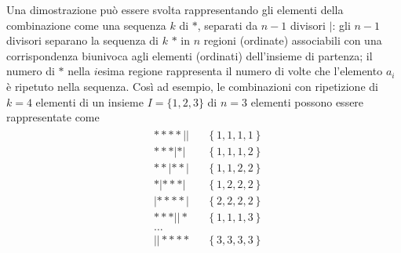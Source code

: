 \documentclass[letterpaper,10pt,italian]{jupyterBook}
\begin{document}
\sphinxAtStartPar
Una dimostrazione può essere svolta rappresentando gli elementi della combinazione come una sequenza \(k\) di \(\ast\), separati da \(n-1\) divisori \(|\): gli \(n-1\) divisori separano la sequenza di \(k\) \(\ast\) in \(n\) regioni (ordinate) associabili con una corrispondenza biunivoca agli elementi (ordinati) dell’insieme di partenza; il numero di \(\ast\) nella \(i\)\sphinxhyphen{}esima regione rappresenta il numero di volte che l’elemento \(a_i\) è ripetuto nella sequenza. Così ad esempio, le combinazioni con ripetizione di \(k=4\) elementi di un insieme \(I = \{ 1,2,3 \}\) di \(n=3\) elementi possono essere rappresentate come
\begin{equation*}
\begin{split}\begin{aligned}
  &    \ast    \ast   \ast    \ast || && \left\{  1,1,1,1 \right\} \\
  &    \ast    \ast   \ast |  \ast |  && \left\{  1,1,1,2 \right\} \\
  &    \ast    \ast | \ast    \ast |  && \left\{  1,1,2,2 \right\} \\
  &    \ast |  \ast   \ast    \ast |  && \left\{  1,2,2,2 \right\} \\
  & |  \ast    \ast   \ast    \ast |  && \left\{  2,2,2,2 \right\} \\
  &    \ast    \ast   \ast || \ast    && \left\{  1,1,1,3 \right\} \\
  & \dots \\
  & || \ast    \ast   \ast    \ast    && \left\{  3,3,3,3 \right\} \\
\end{aligned}\end{split}
\end{equation*}\label{ch/statistics/combinatorics:ex-combinations-with-rep-1}
\end{document}
